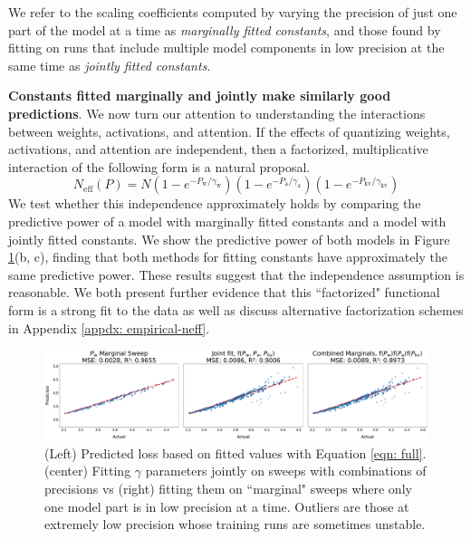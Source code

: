 \documentclass[11pt]{article}
\begin{document}
We refer to the scaling coefficients computed by varying the precision of just one part of the model at a time as \textit{marginally fitted constants}, and those found by fitting on runs that include multiple model components in low precision at the same time as \textit{jointly fitted constants}.  

\textbf{Constants fitted marginally and jointly make similarly good predictions}.
We now turn our attention to understanding the interactions between weights, activations, and attention. If the effects of quantizing weights, activations, and attention are independent, then a factorized, multiplicative interaction of the following form is a natural proposal. 
\begin{equation}
\label{eqn: full}
    N_\text{eff}(P) = N(1-e^{-P_\text{w}/\gamma_\text{w}})(1-e^{-P_\text{a}/\gamma_\text{a}})(1-e^{-P_\text{kv}/\gamma_\text{kv}})
\end{equation}
We test whether this independence approximately holds by comparing the predictive power of a model with marginally fitted constants and a model with jointly fitted constants.
We show the predictive power of both models in Figure \ref{fig:validate-qat-law}(b, c), finding that both methods for fitting constants have approximately the same predictive power.
These results suggest that the independence assumption is reasonable.
We both present further evidence that this ``factorized" functional form is a strong fit to the data as well as discuss alternative factorization schemes in Appendix \ref{appdx: empirical-neff}. 

\begin{figure}
    \centering
    \includegraphics[width=\linewidth]{predictions_comparison_new_evals.pdf}
    \caption{(Left) Predicted loss based on fitted values with Equation \ref{eqn: full}. (center) Fitting $\gamma$ parameters jointly on sweeps with combinations of precisions vs (right) fitting them on ``marginal" sweeps where only one model part is in low precision at a time. Outliers are those at extremely low precision whose training runs are sometimes unstable.}
    \label{fig:validate-qat-law}
\end{figure}
\end{document}
